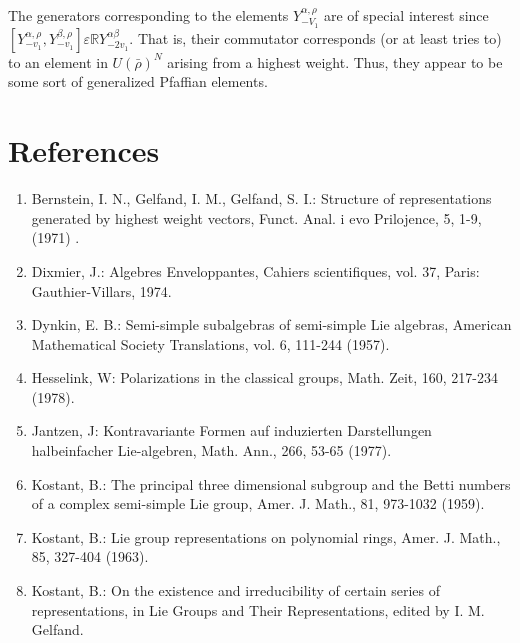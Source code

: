 \documentclass[10pt]{article}
\begin{document}
The generators corresponding to the elements $Y_{-V_{1}}^{\alpha, \rho}$ are of special interest since $\left[Y_{-v_{1}}^{\alpha, \rho}, Y_{-v_{1}}^{\beta, \rho}\right] \varepsilon \mathbb{R} Y_{-2 v_{1}}^{\alpha \beta}$. That is, their commutator corresponds (or at least tries to) to an element in $U(\bar{\rho})^{N}$ arising from a highest weight. Thus, they appear to be some sort of generalized Pfaffian elements.

\section{References}
\begin{enumerate}
  \item Bernstein, I. N., Gelfand, I. M., Gelfand, S. I.: Structure of representations generated by highest weight vectors, Funct. Anal. i evo Prilojence, 5, 1-9, (1971) .
  \item Dixmier, J.: Algebres Enveloppantes, Cahiers scientifiques, vol. 37, Paris: Gauthier-Villars, 1974.
  \item Dynkin, E. B.: Semi-simple subalgebras of semi-simple Lie algebras, American Mathematical Society Translations, vol. 6, 111-244 (1957).
  \item Hesselink, W: Polarizations in the classical groups, Math. Zeit, 160, 217-234 (1978).
  \item Jantzen, J: Kontravariante Formen auf induzierten Darstellungen halbeinfacher Lie-algebren, Math. Ann., 266, 53-65 (1977).
  \item Kostant, B.: The principal three dimensional subgroup and the Betti numbers of a complex semi-simple Lie group, Amer. J. Math., 81, 973-1032 (1959).
  \item Kostant, B.: Lie group representations on polynomial rings, Amer. J. Math., 85, 327-404 (1963).
  \item Kostant, B.: On the existence and irreducibility of certain series of representations, in Lie Groups and Their Representations, edited by I. M. Gelfand.
\end{enumerate}
\end{document}
